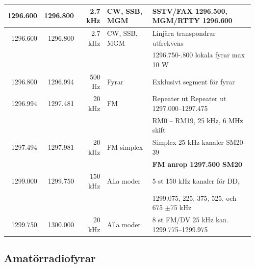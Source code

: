 {{\begin{tabular}{rrrll}
	         1296.600 & 1296.800 &     2.7 kHz & CW, SSB, MGM    & SSTV/FAX 1296.500, MGM/RTTY 1296.600          \\ \hline
	         1296.600 & 1296.800 &     2.7 kHz & CW, SSB, MGM    & Linjära transpondrar utfrekvens               \\
	                  &          &             &                 & 1296.750-.800 lokala fyrar max 10 W           \\ \hline
	         1296.800 & 1296.994 &      500 Hz & Fyrar           & Exklusivt segment för fyrar                   \\ \hline
	         1296.994 & 1297.481 &      20 kHz & FM              & Repeater ut Repeater ut 1297.000--1297.475    \\
	                  &          &             &                 & RM0 – RM19, 25 kHz, 6 MHz skift               \\ \hline
	         1297.494 & 1297.981 &      20 kHz & FM simplex      & Simplex 25 kHz kanaler SM20--39               \\
	                  &          &             &                 & \textbf{FM anrop 1297.500 SM20}               \\ \hline
	         1299.000 & 1299.750 &     150 kHz & Alla moder      & 5 st 150 kHz kanaler för DD,                  \\
	                  &          &             &                 & 1299.075, 225, 375, 525, och 675 $\pm$75 kHz  \\ \hline
	         1299.750 & 1300.000 &      20 kHz & Alla moder      & 8 st FM/DV 25 kHz kan. 1299.775--1299.975
\end{tabular}}

\clearpage

\begin{landscape}
\section{Amatörradiofyrar}

\end{landscape}}
